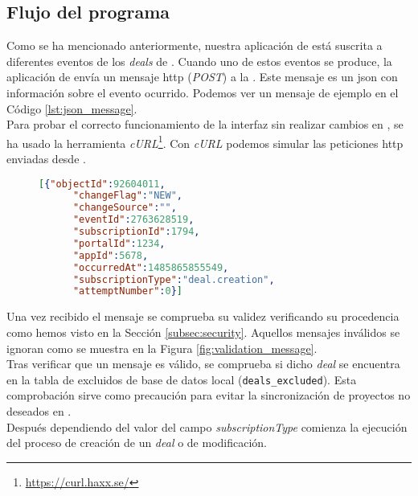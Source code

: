 \subsection{Flujo del programa}

Como se ha mencionado anteriormente, nuestra aplicación de \hs{} está suscrita a diferentes eventos de los \textit{deals} de \hs{}.
Cuando uno de estos eventos se produce, la aplicación de \hs{} envía un mensaje \acrshort{http} (\textit{POST}) a la \iface{}. Este mensaje es un \acrshort{json} con información sobre el evento ocurrido. Podemos ver un mensaje de ejemplo en el Código \ref{lst:json_message}.\\

Para probar el correcto funcionamiento de la interfaz sin realizar cambios en \hs{}, se ha usado la herramienta \textit{cURL}\footnote{\url{https://curl.haxx.se/}}. 
Con \textit{cURL} podemos simular las peticiones \acrshort{http} enviadas desde \hs{}.\\

\begin{figure}
\begin{lstlisting}[caption={Ejemplo de mensaje recibido por la \iface{}},label={lst:json_message}, language=json]
	[{"objectId":92604011,
	  "changeFlag":"NEW",
	  "changeSource":"",
	  "eventId":2763628519,
	  "subscriptionId":1794,
	  "portalId":1234,
	  "appId":5678,
	  "occurredAt":1485865855549,
	  "subscriptionType":"deal.creation",
	  "attemptNumber":0}]
\end{lstlisting}
\end{figure}
 
Una vez recibido el mensaje se comprueba su validez verificando su procedencia como hemos visto en la Sección \ref{subsec:security}. Aquellos mensajes inválidos se ignoran como se muestra en la Figura  \ref{fig:validation_message}.\\

Tras verificar que un mensaje es válido, se comprueba si dicho \textit{deal} se encuentra en la tabla de excluidos de base de datos local (\texttt{deals\_excluded}). 
Esta comprobación sirve como precaución para evitar la sincronización de proyectos no deseados en \wday{}.\\

Después dependiendo del valor del campo \textit{subscriptionType} comienza la ejecución del proceso de creación de un \textit{deal} o de modificación.

